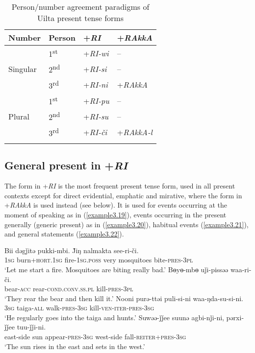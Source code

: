 \documentclass[output=paper,colorlinks,citecolor=brown]{langscibook}
\begin{document}
\begin{table}
\caption{Person/number agreement paradigms of Uilta present tense forms}
\label{table:4}
 \begin{tabular}{llll}
  \lsptoprule
Number & Person & +\textit{RI} & +\textit{RAkkA}\\
  \midrule
&   1\textsuperscript{st}  &   +\textit{RI-wi}      & –\\
Singular &   2\textsuperscript{nd}  &   +\textit{RI-si}      & –\\
&   3\textsuperscript{rd}  &   +\textit{RI-ni}      & +\textit{RAkkA}\\
  \midrule
&   1\textsuperscript{st}  &   +\textit{RI-pu}      & –\\
Plural &  2\textsuperscript{nd}  &    +\textit{RI-su}      & –\\
&   3\textsuperscript{rd}  &   +\textit{RI-či}      & +\textit{RAkkA-l}\\
  \lspbottomrule
 \end{tabular}
\end{table}

\subsection{General present in +\textit{RI}}\label{Section3.4.1}

The form in +\textit{RI} is the most frequent present tense form, used in all present contexts except for direct evidential, emphatic and mirative, where the form in +\textit{RAkkA} is used instead (see below). It is used for events occurring at the moment of speaking as in (\ref{example3.19}), events occurring in the present generally (generic present) as in (\ref{example3.20}), habitual events (\ref{example3.21}), and general statements (\ref{example3.22}).

\ea
\label{example3.19}
\gll Bii	dəgǰitə			pukki-mbi.		J̌iŋ		nalmakta		see-ri-či.\\
     	\textsc{1sg}	burn+\textsc{hort}.\textsc{1sg}	fire-\textsc{1sg}.\textsc{poss}		very		mosquitoes	bite-\textsc{pres}-\textsc{3pl}\\
\glt `Let me start a fire. Mosquitoes are biting really bad.’
\ex
\label{example3.20}
\gll Bɵyɵ-mbɵ	uǰi-pissəə 				waa-ri-či.\\
     	bear-\textsc{acc}		rear-\textsc{cond}.\textsc{conv}.\textsc{ss}.\textsc{pl}		kill-\textsc{pres}-\textsc{3pl}\\
\glt `They rear the bear and then kill it.’
\ex
\label{example3.21}
\gll Nooni	purə-ttəi		puli-si-ni			waa-ŋda-su-si-ni.\\
     	\textsc{3sg}		taiga-\textsc{all}	walk-\textsc{pres}-\textsc{3sg}	kill-\textsc{ven}-\textsc{iter}-\textsc{pres}-\textsc{3sg}\\
\glt `He regularly goes into the taiga and hunts.’
\ex
\label{example3.22}
\gll Suwəə-ǰǰee	suunə	agbi-nǰi-ni,		pərxi-ǰǰee	tuu-ǰǰi-ni.\\
     	east-side		sun		appear-\textsc{pres}-\textsc{3sg}	west-side	fall-\textsc{reiter}+\textsc{pres}-\textsc{3sg}\\
\glt `The sun rises in the east and sets in the west.’
\z
\end{document}
